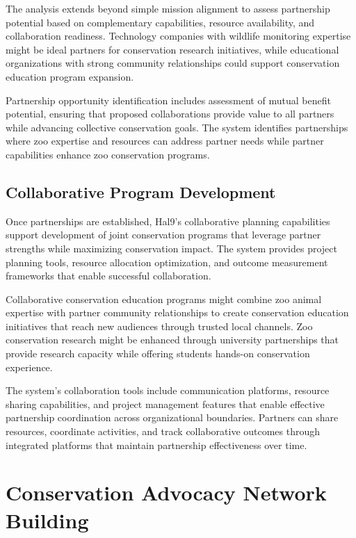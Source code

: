\documentclass[
  Letterpaper,
]{scrbook}
\begin{document}
The analysis extends beyond simple mission alignment to assess
partnership potential based on complementary capabilities, resource
availability, and collaboration readiness. Technology companies with
wildlife monitoring expertise might be ideal partners for conservation
research initiatives, while educational organizations with strong
community relationships could support conservation education program
expansion.

Partnership opportunity identification includes assessment of mutual
benefit potential, ensuring that proposed collaborations provide value
to all partners while advancing collective conservation goals. The
system identifies partnerships where zoo expertise and resources can
address partner needs while partner capabilities enhance zoo
conservation programs.

\subsection{Collaborative Program
Development}\label{collaborative-program-development}

Once partnerships are established, Hal9's collaborative planning
capabilities support development of joint conservation programs that
leverage partner strengths while maximizing conservation impact. The
system provides project planning tools, resource allocation
optimization, and outcome measurement frameworks that enable successful
collaboration.

Collaborative conservation education programs might combine zoo animal
expertise with partner community relationships to create conservation
education initiatives that reach new audiences through trusted local
channels. Zoo conservation research might be enhanced through university
partnerships that provide research capacity while offering students
hands-on conservation experience.

The system's collaboration tools include communication platforms,
resource sharing capabilities, and project management features that
enable effective partnership coordination across organizational
boundaries. Partners can share resources, coordinate activities, and
track collaborative outcomes through integrated platforms that maintain
partnership effectiveness over time.

\section{Conservation Advocacy Network
Building}\label{conservation-advocacy-network-building}
\end{document}
